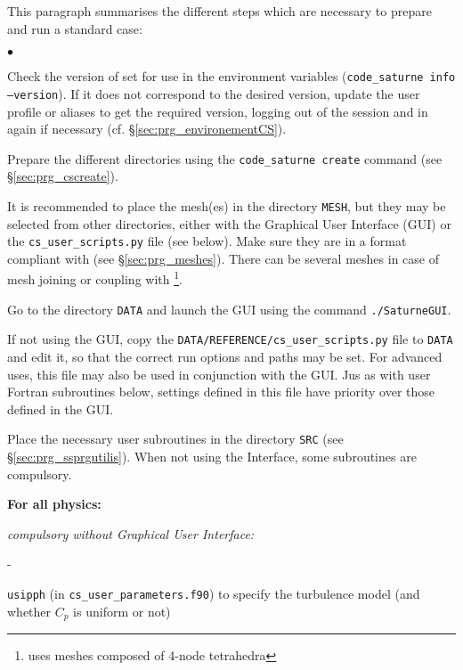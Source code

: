 {{{This paragraph summarises the different steps which are necessary to
prepare and run a standard case:

\begin{list}{$\bullet$}{}

\item Check the version of \CS set for use in the environment variables
(\texttt{code\_saturne~info --version}). If it does not correspond to
the desired version, update the user profile or aliases to get the
required version, logging out of the session and in again if necessary (cf.
\S\ref{sec:prg_environementCS}).

\item Prepare the different directories using the \texttt{code\_saturne~create}
command (see \S\ref{sec:prg_cscreate}).

\item It is recommended to place the mesh(es) in the directory \texttt{MESH},
but they may be selected from other directories, either with the Graphical User Interface (GUI)
 or the \texttt{cs\_user\_scripts.py} file (see below). Make sure they are
in a format compliant with \CS (see \S\ref{sec:prg_meshes}). There can be
several meshes in case of mesh joining or coupling with
\syrthes\footnote{ uses meshes composed of 4-node tetrahedra}.

\item Go to the directory \texttt{DATA} and launch the
      GUI using the command \texttt{./SaturneGUI}.

\item If not using the GUI, copy the
  \texttt{DATA/REFERENCE/cs\_user\_scripts.py} file to \texttt{DATA} and
  edit it, so that the correct run options and paths may be set. For advanced
  uses, this file may also be used in conjunction with the GUI. Jus as with
  user Fortran subroutines below, settings defined in this file have priority
  over those defined in the GUI.

\item Place the necessary user subroutines in the directory \texttt{SRC} (see
\S\ref{sec:prg_ssprgutilis}). When not using the Interface, some subroutines are
compulsory.

\begin{list}{}{}

\item {\bf For all physics:}

    \begin{list}{}{}
        \item {\em compulsory without Graphical User Interface:}
        \begin{list}{-}{}
            \item \texttt{usipph} (in \texttt{cs\_user\_parameters.f90}) to
              specify the turbulence model (and whether $C_p$ is uniform or not)


\end{list}
\end{list}
\end{list}
\end{list}}}}
